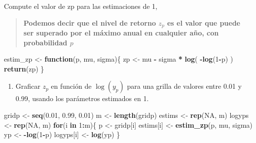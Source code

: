 \documentclass[
]{article}
\newenvironment{Shaded}{\begin{snugshade}}{\end{snugshade}}
\newcommand{\ControlFlowTok}[1]{\textcolor[rgb]{0.13,0.29,0.53}{\textbf{#1}}}
\newcommand{\DecValTok}[1]{\textcolor[rgb]{0.00,0.00,0.81}{#1}}
\newcommand{\FloatTok}[1]{\textcolor[rgb]{0.00,0.00,0.81}{#1}}
\newcommand{\KeywordTok}[1]{\textcolor[rgb]{0.13,0.29,0.53}{\textbf{#1}}}
\newcommand{\NormalTok}[1]{#1}
\newcommand{\OperatorTok}[1]{\textcolor[rgb]{0.81,0.36,0.00}{\textbf{#1}}}
\newcommand{\OtherTok}[1]{\textcolor[rgb]{0.56,0.35,0.01}{#1}}
\newcommand{\StringTok}[1]{\textcolor[rgb]{0.31,0.60,0.02}{#1}}
\providecommand{\tightlist}{%
  \setlength{\itemsep}{0pt}\setlength{\parskip}{0pt}}
\begin{document}
Compute el valor de zp para las estimaciones de 1,

\begin{quote}
\textbf{Podemos decir que el nivel de retorno \(z_p\) es el valor que
puede ser superado por el máximo anual en cualquier año, con
probabilidad \(p\)}
\end{quote}

\begin{Shaded}
\begin{Highlighting}[]
\NormalTok{estim_zp <-}\StringTok{ }\ControlFlowTok{function}\NormalTok{(p, mu, sigma)\{}
\NormalTok{    zp <-}\StringTok{ }\NormalTok{mu }\OperatorTok{-}\StringTok{ }\NormalTok{sigma }\OperatorTok{*}\StringTok{ }\KeywordTok{log}\NormalTok{( }\OperatorTok{-}\KeywordTok{log}\NormalTok{(}\DecValTok{1}\OperatorTok{-}\NormalTok{p) )}
    \KeywordTok{return}\NormalTok{(zp)}
\NormalTok{\}}
\end{Highlighting}
\end{Shaded}

\begin{enumerate}
\def\labelenumi{\arabic{enumi}.}
\setcounter{enumi}{2}
\tightlist
\item
  Graficar \(z_p\) en función de \(\log(y_p)\) para una grilla de
  valores entre 0.01 y 0.99, usando los parámetros estimados en 1.
\end{enumerate}

\begin{Shaded}
\end{Shaded}

\begin{Shaded}
\begin{Highlighting}[]
\NormalTok{gridp <-}\StringTok{ }\KeywordTok{seq}\NormalTok{(}\FloatTok{0.01}\NormalTok{, }\FloatTok{0.99}\NormalTok{, }\FloatTok{0.01}\NormalTok{)}
\NormalTok{m <-}\StringTok{ }\KeywordTok{length}\NormalTok{(gridp)}
\NormalTok{estims <-}\StringTok{ }\KeywordTok{rep}\NormalTok{(}\OtherTok{NA}\NormalTok{, m)}
\NormalTok{logyps <-}\StringTok{ }\KeywordTok{rep}\NormalTok{(}\OtherTok{NA}\NormalTok{, m)}
\ControlFlowTok{for}\NormalTok{(i }\ControlFlowTok{in} \DecValTok{1}\OperatorTok{:}\NormalTok{m)\{}
\NormalTok{    p <-}\StringTok{ }\NormalTok{gridp[i]}
\NormalTok{    estims[i] <-}\StringTok{ }\KeywordTok{estim_zp}\NormalTok{(p, mu, sigma)}
\NormalTok{    yp <-}\StringTok{ }\OperatorTok{-}\KeywordTok{log}\NormalTok{(}\DecValTok{1}\OperatorTok{-}\NormalTok{p)}
\NormalTok{    logyps[i] <-}\StringTok{ }\KeywordTok{log}\NormalTok{(yp)}
\NormalTok{\}}
\end{Highlighting}
\end{Shaded}
\end{document}
